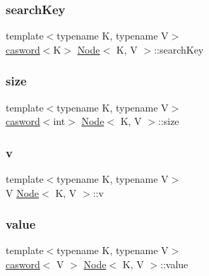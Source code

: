 \mbox{\label{classNode_a788327695ace7c76fd69877322f57b4e}} 
\subsubsection{\texorpdfstring{search\+Key}{searchKey}}
{\footnotesize\ttfamily template$<$typename K, typename V$>$ \\
\hyperlink{structcasword}{casword}$<$K$>$ \hyperlink{classNode}{Node}$<$ K, V $>$\+::search\+Key}

\mbox{\label{classNode_a65f7073a99f7d2b7ee735cd548bd6f9b}} 
\subsubsection{\texorpdfstring{size}{size}}
{\footnotesize\ttfamily template$<$typename K, typename V$>$ \\
\hyperlink{structcasword}{casword}$<$int$>$ \hyperlink{classNode}{Node}$<$ K, V $>$\+::size}

\mbox{\label{classNode_aae93698bf451fa862b4b1b5466d36dfd}} 
\subsubsection{\texorpdfstring{v}{v}}
{\footnotesize\ttfamily template$<$typename K, typename V$>$ \\
V \hyperlink{classNode}{Node}$<$ K, V $>$\+::v}

\mbox{\label{classNode_afb1f58df40fc63f650d0ba9eb165cdb4}} 
\subsubsection{\texorpdfstring{value}{value}\hspace{0.1cm}{\footnotesize\ttfamily [1/2]}}
{\footnotesize\ttfamily template$<$typename K, typename V$>$ \\
\hyperlink{structcasword}{casword}$<$ V $>$ \hyperlink{classNode}{Node}$<$ K, V $>$\+::value}

\mbox{\label{classNode_ad26872ac51fa4ef5a8519038472a5050}} 
